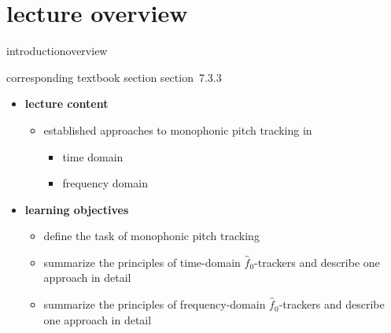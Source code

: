 


\subtitle{Module 7.3.3: Fundamental Frequency Detection in Monophonic Signals}


	

    \section[overview]{lecture overview}
        \begin{frame}{introduction}{overview}
            \begin{block}{corresponding textbook section}
                    section~7.3.3
            \end{block}

            \begin{itemize}
                \item   \textbf{lecture content}
                    \begin{itemize}
                        \item   established approaches to monophonic pitch tracking in
                            \begin{itemize}
                                \item   time domain
                                \item   frequency domain
                            \end{itemize}
                    \end{itemize}
                \bigskip
                \item<2->   \textbf{learning objectives}
                    \begin{itemize}
                        \item   define the task of monophonic pitch tracking
                        \item   summarize the principles of time-domain $\hat{f}_0$-trackers and describe one approach in detail
                        \item   summarize the principles of frequency-domain $\hat{f}_0$-trackers and describe one approach in detail
                    \end{itemize}
            \end{itemize}
        \end{frame}


